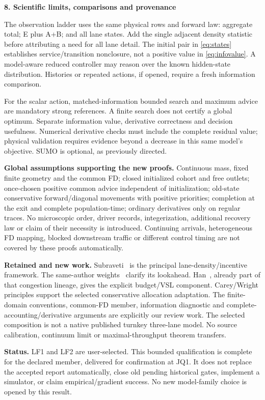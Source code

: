 \documentclass[10pt,a4paper]{article}
\newcommand{\head}[1]{\par\medskip\textbf{#1}\par}
\begin{document}
\newpage
\head{8. Scientific limits, comparisons and provenance}
The observation ladder uses the same physical rows and forward law:
aggregate total; E plus A+B; and all lane states. Add the single adjacent
density statistic before attributing a need for all lane detail. The initial
pair in \eqref{eq:states} establishes service/transition nonclosure, not a
positive value in \eqref{eq:infovalue}. A model-aware reduced controller may
reason over the known hidden-state distribution. Histories or repeated
actions, if opened, require a fresh information comparison.

For the scalar action, matched-information bounded search and maximum advice
are mandatory strong references. A finite search does not certify a global
optimum. Separate information value, derivative correctness and decision
usefulness. Numerical derivative checks must include the complete residual
value; physical validation requires evidence beyond a decrease in this
same model's objective. SUMO is optional, as previously directed.

\textbf{Global assumptions supporting the new proofs.} Continuous mass,
fixed finite geometry and the common FD; closed initialized cohort and free
outlets; once-chosen positive common advice independent of initialization;
old-state conservative forward/diagonal movements with positive priorities;
completion at the exit and complete population-time; ordinary derivatives
only on regular traces. No microscopic order, driver records, integerization,
additional recovery law or claim of their necessity is introduced. Continuing
arrivals, heterogeneous FD mapping, blocked downstream traffic or different
control timing are not covered by these proofs automatically.

\textbf{Retained and new work.} Subraveti~\cite{ns} is the principal
lane-density/incentive framework. The same-author weights~\cite{thesis}
clarify its lookahead. Han~\cite{han16,han17}, already part of that congestion
lineage, gives the explicit budget/VSL component. Carey/Wright principles
\cite{carey,wright} support the selected conservative allocation adaptation.
The finite-domain conventions, common-FD member, information diagnostic and
complete-accounting/derivative arguments are explicitly our review work.
The selected composition is not a native published turnkey three-lane model.
No source calibration, continuum limit or maximal-throughput theorem transfers.

\textbf{Status.} LF1 and LF2 are user-selected. This bounded qualification is
complete for the declared member, delivered for confirmation at JQ1. It does
not replace the accepted report automatically, close old pending historical
gates, implement a simulator, or claim empirical/gradient success. No new
model-family choice is opened by this result.
\end{document}

